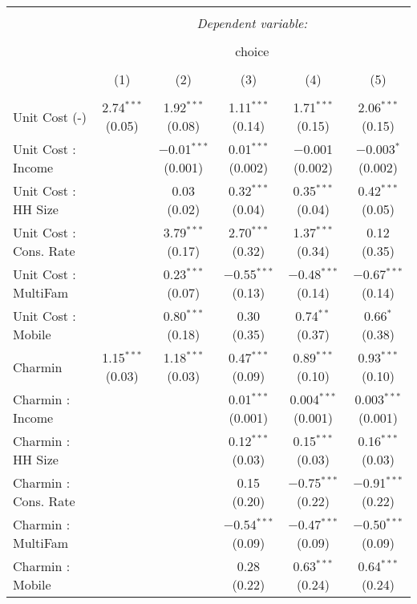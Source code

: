 
\begin{table}[!htbp] \centering 
  \caption{} 
  \label{tab:mnlColumbusObsHet} 
\begin{tabular}{@{\extracolsep{5pt}}lccccc} 
\\[-1.8ex]\hline 
\hline \\[-1.8ex] 
 & \multicolumn{5}{c}{\textit{Dependent variable:}} \\ 
\cline{2-6} 
\\[-1.8ex] & \multicolumn{5}{c}{choice} \\ 
\\[-1.8ex] & (1) & (2) & (3) & (4) & (5)\\ 
\hline \\[-1.8ex] 
 Unit Cost (-) & 2.74$^{***}$ (0.05) & 1.92$^{***}$ (0.08) & 1.11$^{***}$ (0.14) & 1.71$^{***}$ (0.15) & 2.06$^{***}$ (0.15) \\ 
  Unit Cost : Income &  & $-$0.01$^{***}$ (0.001) & 0.01$^{***}$ (0.002) & $-$0.001 (0.002) & $-$0.003$^{*}$ (0.002) \\ 
  Unit Cost : HH Size &  & 0.03 (0.02) & 0.32$^{***}$ (0.04) & 0.35$^{***}$ (0.04) & 0.42$^{***}$ (0.05) \\ 
  Unit Cost : Cons. Rate &  & 3.79$^{***}$ (0.17) & 2.70$^{***}$ (0.32) & 1.37$^{***}$ (0.34) & 0.12 (0.35) \\ 
  Unit Cost : MultiFam &  & 0.23$^{***}$ (0.07) & $-$0.55$^{***}$ (0.13) & $-$0.48$^{***}$ (0.14) & $-$0.67$^{***}$ (0.14) \\ 
  Unit Cost : Mobile &  & 0.80$^{***}$ (0.18) & 0.30 (0.35) & 0.74$^{**}$ (0.37) & 0.66$^{*}$ (0.38) \\ 
  Charmin & 1.15$^{***}$ (0.03) & 1.18$^{***}$ (0.03) & 0.47$^{***}$ (0.09) & 0.89$^{***}$ (0.10) & 0.93$^{***}$ (0.10) \\ 
  Charmin : Income &  &  & 0.01$^{***}$ (0.001) & 0.004$^{***}$ (0.001) & 0.003$^{***}$ (0.001) \\ 
  Charmin : HH Size &  &  & 0.12$^{***}$ (0.03) & 0.15$^{***}$ (0.03) & 0.16$^{***}$ (0.03) \\ 
  Charmin : Cons. Rate &  &  & 0.15 (0.20) & $-$0.75$^{***}$ (0.22) & $-$0.91$^{***}$ (0.22) \\ 
  Charmin : MultiFam &  &  & $-$0.54$^{***}$ (0.09) & $-$0.47$^{***}$ (0.09) & $-$0.50$^{***}$ (0.09) \\ 
  Charmin : Mobile &  &  & 0.28 (0.22) & 0.63$^{***}$ (0.24) & 0.64$^{***}$ (0.24) \\ 

\end{tabular}
\end{table}
